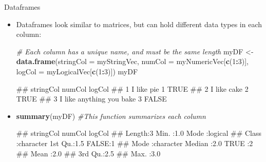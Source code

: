 \documentclass[
  ignorenonframetext,
  aspectratio=169]{beamer}
\newenvironment{Shaded}{\begin{snugshade}}{\end{snugshade}}
\newcommand{\AttributeTok}[1]{\textcolor[rgb]{0.13,0.29,0.53}{#1}}
\newcommand{\CommentTok}[1]{\textcolor[rgb]{0.56,0.35,0.01}{\textit{#1}}}
\newcommand{\DecValTok}[1]{\textcolor[rgb]{0.00,0.00,0.81}{#1}}
\newcommand{\FunctionTok}[1]{\textcolor[rgb]{0.13,0.29,0.53}{\textbf{#1}}}
\newcommand{\NormalTok}[1]{#1}
\newcommand{\OtherTok}[1]{\textcolor[rgb]{0.56,0.35,0.01}{#1}}
\newcommand{\SpecialCharTok}[1]{\textcolor[rgb]{0.81,0.36,0.00}{\textbf{#1}}}
\let\oldShaded\Shaded %
\let\endoldShaded\endShaded
\renewenvironment{Shaded}{\footnotesize\oldShaded}{\endoldShaded}
\let\oldverbatim\verbatim %Change fontsize of code chunk output
\let\endoldverbatim\endverbatim
\renewenvironment{verbatim}{\footnotesize\oldverbatim}{\endoldverbatim}
\begin{document}
\begin{frame}[fragile]{Dataframes}
\protect\hypertarget{dataframes}{}
\begin{itemize}[<+->]
\item
  Dataframes look similar to matrices, but can hold different data types
  in each column:

\begin{Shaded}
\begin{Highlighting}[]
\CommentTok{\# Each column has a unique name, and must be the same length}
\NormalTok{myDF }\OtherTok{\textless{}{-}} \FunctionTok{data.frame}\NormalTok{(}\AttributeTok{stringCol =}\NormalTok{ myStringVec, }\AttributeTok{numCol =}\NormalTok{ myNumericVec[}\FunctionTok{c}\NormalTok{(}\DecValTok{1}\SpecialCharTok{:}\DecValTok{3}\NormalTok{)], }\AttributeTok{logCol =}\NormalTok{ myLogicalVec[}\FunctionTok{c}\NormalTok{(}\DecValTok{1}\SpecialCharTok{:}\DecValTok{3}\NormalTok{)])}
\NormalTok{myDF}
\end{Highlighting}
\end{Shaded}

\begin{verbatim}
##                  stringCol numCol logCol
## 1               I like pie      1   TRUE
## 2              I like cake      2   TRUE
## 3 I like anything you bake      3  FALSE
\end{verbatim}
\item
\begin{Shaded}
\begin{Highlighting}[]
\FunctionTok{summary}\NormalTok{(myDF)  }\CommentTok{\#This function summarizes each column}
\end{Highlighting}
\end{Shaded}

\begin{verbatim}
##   stringCol             numCol      logCol       
##  Length:3           Min.   :1.0   Mode :logical  
##  Class :character   1st Qu.:1.5   FALSE:1        
##  Mode  :character   Median :2.0   TRUE :2        
##                     Mean   :2.0                  
##                     3rd Qu.:2.5                  
##                     Max.   :3.0
\end{verbatim}
\end{itemize}
\end{frame}
\end{document}
